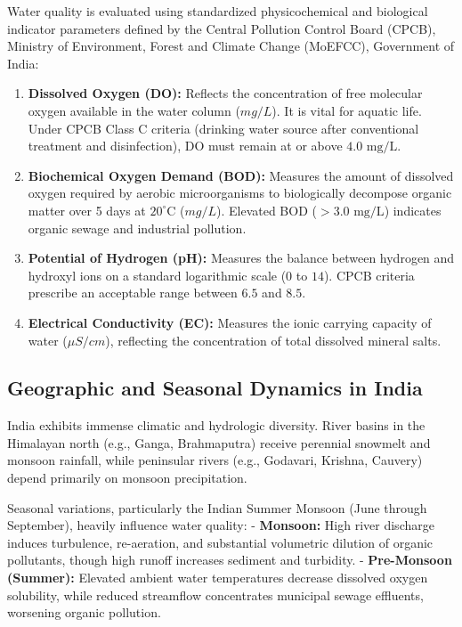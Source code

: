 \documentclass[
]{article}
\providecommand{\tightlist}{%
  \setlength{\itemsep}{0pt}\setlength{\parskip}{0pt}}
\begin{document}
Water quality is evaluated using standardized physicochemical and
biological indicator parameters defined by the Central Pollution Control
Board (CPCB), Ministry of Environment, Forest and Climate Change
(MoEFCC), Government of India:

\begin{enumerate}
\def\labelenumi{\arabic{enumi}.}
\tightlist
\item
  \textbf{Dissolved Oxygen (DO):} Reflects the concentration of free
  molecular oxygen available in the water column (\(mg/L\)). It is vital
  for aquatic life. Under CPCB Class C criteria (drinking water source
  after conventional treatment and disinfection), DO must remain at or
  above \(4.0\text{ mg/L}\).
\item
  \textbf{Biochemical Oxygen Demand (BOD):} Measures the amount of
  dissolved oxygen required by aerobic microorganisms to biologically
  decompose organic matter over 5 days at \(20^\circ\text{C}\)
  (\(mg/L\)). Elevated BOD (\(> 3.0\text{ mg/L}\)) indicates organic
  sewage and industrial pollution.
\item
  \textbf{Potential of Hydrogen (pH):} Measures the balance between
  hydrogen and hydroxyl ions on a standard logarithmic scale (\(0\) to
  \(14\)). CPCB criteria prescribe an acceptable range between \(6.5\)
  and \(8.5\).
\item
  \textbf{Electrical Conductivity (EC):} Measures the ionic carrying
  capacity of water (\(\mu S/cm\)), reflecting the concentration of
  total dissolved mineral salts.
\end{enumerate}

\subsection{Geographic and Seasonal Dynamics in
India}\label{geographic-and-seasonal-dynamics-in-india}

India exhibits immense climatic and hydrologic diversity. River basins
in the Himalayan north (e.g., Ganga, Brahmaputra) receive perennial
snowmelt and monsoon rainfall, while peninsular rivers (e.g., Godavari,
Krishna, Cauvery) depend primarily on monsoon precipitation.

Seasonal variations, particularly the Indian Summer Monsoon (June
through September), heavily influence water quality: - \textbf{Monsoon:}
High river discharge induces turbulence, re-aeration, and substantial
volumetric dilution of organic pollutants, though high runoff increases
sediment and turbidity. - \textbf{Pre-Monsoon (Summer):} Elevated
ambient water temperatures decrease dissolved oxygen solubility, while
reduced streamflow concentrates municipal sewage effluents, worsening
organic pollution.
\end{document}
